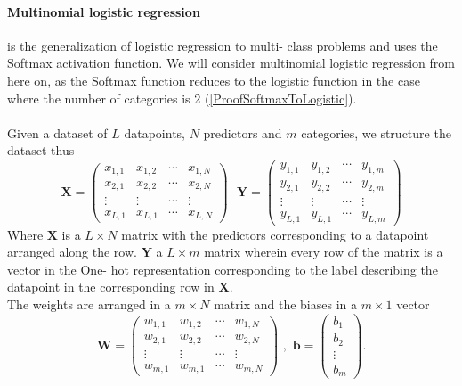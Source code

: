 \documentclass[11pt,a4paper,titlepage]{article}
\begin{document}
\paragraph{Multinomial logistic regression} is the generalization of logistic regression to multi- class problems and uses the Softmax activation function. We will consider multinomial logistic regression from here on, as the Softmax function reduces to the logistic function in the case where the number of categories is 2 (\ref{ProofSoftmaxToLogistic}).\\\\Given a dataset of $L$ datapoints, $N$ predictors and $m$ categories, we structure the dataset thus
\begin{equation}\label{first}
\textbf{X} = 
\begin{pmatrix}
	x_{1,1} &	x_{1,2}	&	\cdots	&	x_{1,N}	\\
	x_{2,1}	&	x_{2,2}	&	\cdots	&	x_{2,N}	\\
	\vdots	&	\vdots	&	\cdots	&	\vdots	\\
	x_{L,1} &	x_{L,1}	&	\cdots	&	x_{L,N}	
\end{pmatrix}\,\,\,\,\textbf{Y} = 
\begin{pmatrix}
	y_{1,1} &	y_{1,2}	&	\cdots	&	y_{1,m}	\\
	y_{2,1}	&	y_{2,2}	&	\cdots	&	y_{2,m}	\\
	\vdots	&	\vdots	&	\cdots	&	\vdots	\\
	y
	_{L,1} &	y_{L,1}	&	\cdots	&	y_{L,m}	
\end{pmatrix}
\end{equation}
Where $\textbf{X}$ is a $L\times N$ matrix with the predictors corresponding to a datapoint arranged along the row. $\textbf{Y}$ a $L\times m$ matrix wherein every row of the matrix is a vector in the One- hot representation corresponding to the label describing the datapoint in the corresponding row in $\textbf{X}$.\\ The weights are arranged in a $m \times N$ matrix and the biases in a $m \times 1$ vector
\begin{equation}
\textbf{W} = \begin{pmatrix}
	w_{1,1} &	w_{1,2}	&	\cdots	&	w_{1,N}	\\
	w_{2,1}	&	w_{2,2}	&	\cdots	&	w_{2,N}	\\
	\vdots	&	\vdots	&	\cdots	&	\vdots	\\
	w_{m,1} &	w_{m,1}	&	\cdots	&	w_{m,N}	
\end{pmatrix}\,\, , \,\, \textbf{b} = 
\begin{pmatrix}
	b_1	\\
	b_2	\\
	\vdots	\\
	b_m
\end{pmatrix}.
\end{equation}
\end{document}
